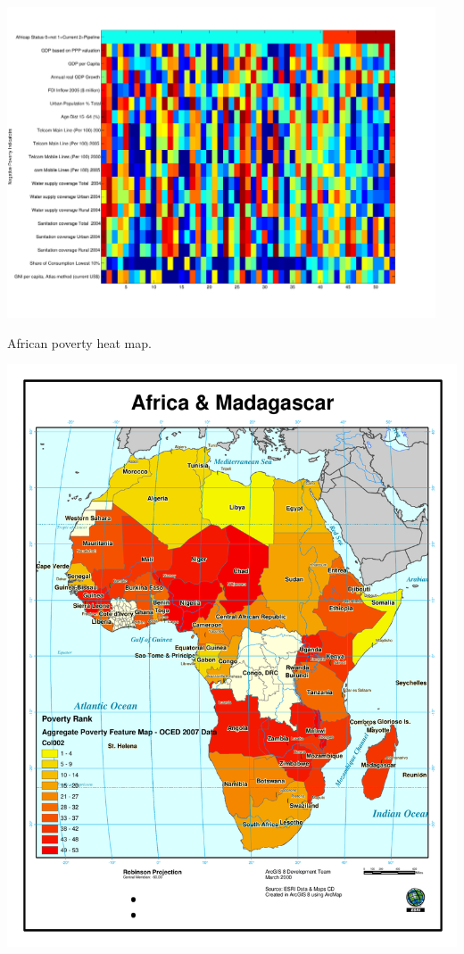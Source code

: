 \includegraphics[width=5in]{Images/GIS/NegativePovertyIndicatorHeatMap.pdf}

\newpage


\newpage
African poverty heat map.

\includegraphics[width=6in]{Images/GIS/PovertyFeatureMapV0.pdf}


